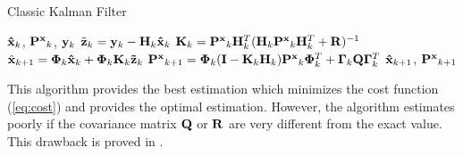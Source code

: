 \begin{algorithm}[H]
\caption{Classic Kalman Filter}
\begin{algorithmic}[1]
\label{al:KF}
\REQUIRE ${\bf \hat x}_k$, ${\bf P^x}_{k}$, ${\bf y}_k$
\STATE $\tilde {\bf z}_k = {\bf y}_k - {\bf H}_k{\bf \hat x}_k$
\STATE ${\bf K}_k = {\bf P^x}_k{\bf H}^T_k({\bf H}_k{\bf P^x}_k{\bf H}^T_k+{\bf R})^{-1}$
\STATE $\hat{\bf x}_{k+1} = \bm{\Phi}_k{\bf \hat x}_k+\bm{\Phi}_k{\bf K}_k{\bf \tilde z}_k$
\STATE ${\bf P^x}_{k+1} = \bm{\Phi}_k({\bf I}-{\bf K}_k{\bf H}_k){\bf P^x}_k\bm{\Phi}^T_k + \bm{\Gamma}_k{\bf Q}\bm{\Gamma}_k^T$
\ENSURE ${\bf \hat x}_{k+1}$, ${\bf P^x}_{k+1}$
\end{algorithmic}
\end{algorithm}

This algorithm provides the best estimation which minimizes the cost function (\ref{eq:cost}) and provides the optimal estimation. However, the algorithm estimates poorly if the covariance matrix ${\bf Q}$ or ${\bf R}$ are very different from the exact value. This drawback is proved in \cite{Sangsuk-Iam1990}.